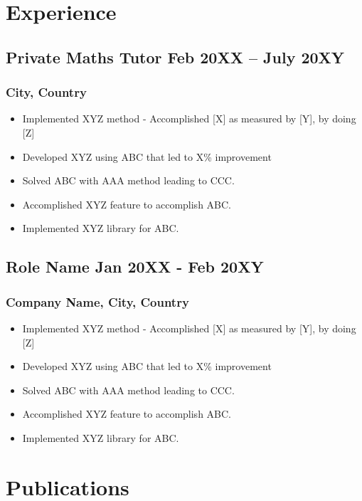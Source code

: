 \documentclass[11pt]{article}
\begin{document}
\section{Experience}
\subsection{Private Maths Tutor \hfill \normalfont Feb 20XX -- July 20XY}
\subsubsection{City, Country}
\begin{itemize}
    \item[\checkmark] Implemented XYZ method - Accomplished [X] as measured by [Y], by doing [Z] 
    \item[\checkmark]  Developed XYZ using ABC that led to X\% improvement 
    \item[\checkmark] Solved ABC with AAA method leading to CCC.
    \item[\checkmark]  Accomplished XYZ feature to accomplish ABC.
    \item[\checkmark]  Implemented XYZ library for ABC.
\end{itemize}

\subsection{Role Name \hfill \normalfont Jan 20XX - Feb 20XY}
\subsubsection{Company Name, City, Country}
\begin{itemize}
    \item[\checkmark] Implemented XYZ method - Accomplished [X] as measured by [Y], by doing [Z] 
    \item[\checkmark]  Developed XYZ using ABC that led to X\% improvement 
    \item[\checkmark] Solved ABC with AAA method leading to CCC.
    \item[\checkmark]  Accomplished XYZ feature to accomplish ABC.
    \item[\checkmark]  Implemented XYZ library for ABC.
\end{itemize}
\section{Publications}
\end{document}
